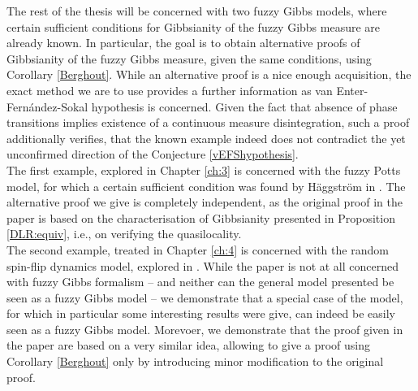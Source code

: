 \documentclass[12pt]{article}
\newcommand{\G}{\mathcal{G}}
\newcommand{\1}{\mathbbm{1}}
\newcommand{\5}{\vspace{0.5cm}}
\theoremstyle{definition}
\begin{document}
The rest of the thesis will be concerned with two fuzzy Gibbs models, where certain sufficient conditions for Gibbsianity of the fuzzy Gibbs measure are already known. In particular, the goal is to obtain alternative proofs of Gibbsianity of the fuzzy Gibbs measure, given the same conditions, using Corollary \ref{Berghout}. While an alternative proof is a nice enough acquisition, the exact method we are to use provides a further information as van Enter-Fern\'andez-Sokal hypothesis is concerned. Given the fact that absence of phase transitions implies existence of a continuous measure disintegration, such a proof additionally verifies, that the known example indeed does not contradict the yet unconfirmed direction of the Conjecture \ref{vEFShypothesis}.\\\iffalse
\begin{tikzpicture}
    \node (A) at (0,0) {continuous measure disintegration};
    \node (B) at (9.5,0) {$\nu=\mu\circ\pi^{-1}$ is Gibbsian};
    \node (C) at (4,3) {$|\G_{\Omega_\sigma}(\Phi)|=1$, $\forall\sigma\in\Sigma$};
    \draw[->, double distance=2pt] (A) -- (B) node[midway, above] {result};
    \draw[->, double distance=2pt] (C) -- (A) node[midway, left] {result};
\end{tikzpicture}\fi

The first example, explored in Chapter \ref{ch:3} is concerned with the fuzzy Potts model, for which a certain sufficient condition was found by H\"aggstr\"om in \cite{Hag}. The alternative proof we give is completely independent, as the original proof in the paper is based on the characterisation of Gibbsianity presented in Proposition \ref{DLR:equiv}, i.e., on verifying the quasilocality. \\

The second example, treated in Chapter \ref{ch:4} is concerned with the random spin-flip dynamics model, explored in \cite{EFHR}. While the paper is not at all concerned with fuzzy Gibbs formalism -- and neither can the general model presented be seen as a fuzzy Gibbs model -- we demonstrate that a special case of the model, for which in particular some interesting results were give, can indeed be easily seen as a fuzzy Gibbs model. Morevoer, we demonstrate that the proof given in the paper are based on a very similar idea, allowing to give a proof using Corollary \ref{Berghout} only by introducing minor modification to the original proof.

\end{document}
